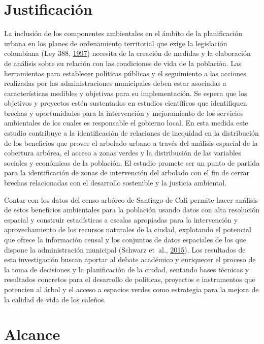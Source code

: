 \documentclass[12pt,a4paper,oneside, openany]{book}
\theoremstyle{definition}
\theoremstyle{definition}
\theoremstyle{definition}
\theoremstyle{remark}
\begin{document}
\section{Justificación}\label{justificaciuxf3n}

La inclusión de los componentes ambientales en el ámbito de la
planificación urbana en los planes de ordenamiento territorial que exige
la legislación colombiana (Ley 388,
\protect\hyperlink{ref-ley388col}{1997}) necesita de la creación de
medidas y la elaboración de análisis sobre su relación con las
condiciones de vida de la población. Las herramientas para establecer
políticas públicas y el seguimiento a las acciones realizadas por las
administraciones municipales deben estar asociadas a características
medibles y objetivas para su implementación. Se espera que los objetivos
y proyectos estén sustentados en estudios científicos que identifiquen
brechas y oportunidades para la intervención y mejoramiento de los
servicios ambientales de los cuales es responsable el gobierno local. En
esta medida este estudio contribuye a la identificación de relaciones de
inequidad en la distribución de los beneficios que provee el arbolado
urbano a través del análisis espacial de la cobertura arbórea, el acceso
a zonas verdes y la distribución de las variables sociales y económicas
de la población. El estudio promete ser un punto de partida para la
identificación de zonas de intervención del arbolado con el fin de
cerrar brechas relacionadas con el desarrollo sostenible y la justicia
ambiental.

Contar con los datos del censo arbóreo de Santiago de Cali permite hacer
análisis de estos beneficios ambientales para la población usando datos
con alta resolución espacial y construir estadísticas a escalas
apropiadas para la intervención y aprovechamiento de los recursos
naturales de la ciudad, explotando el potencial que ofrece la
información censal y los conjuntos de datos espaciales de los que
dispone la administración municipal (Schwarz et~al.,
\protect\hyperlink{ref-schwarz_trees_2015}{2015}). Los resultados de
esta investigación buscan aportar al debate académico y enriquecer el
proceso de la toma de decisiones y la planificación de la ciudad,
sentando bases técnicas y resultados concretos para el desarrollo de
políticas, proyectos e instrumentos que potencien al árbol y el acceso a
espacios verdes como estrategia para la mejora de la calidad de vida de
los caleños.

\section{Alcance}\label{alcance}
\end{document}
